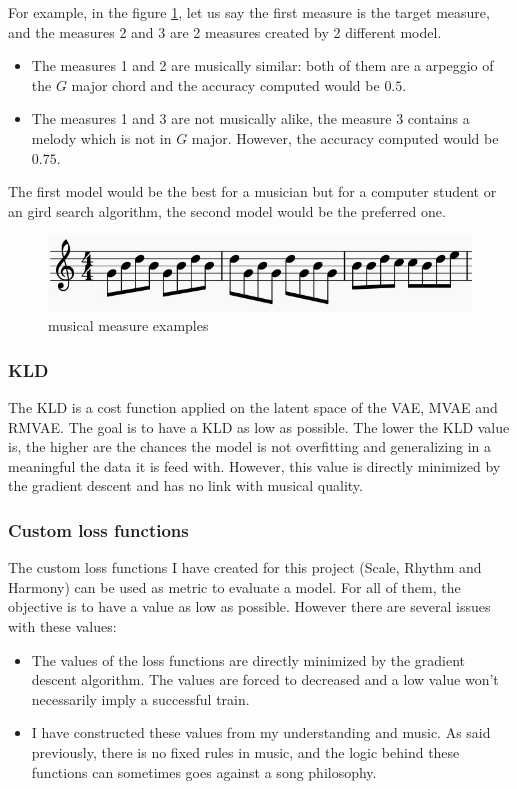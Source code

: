 \documentclass[12pt]{report}
\begin{document}
For example, in the figure \ref{fig:acc-difference}, let us say the first measure is the target measure, and the measures 2 and 3 are 2 measures created by 2 different model.
\begin{itemize}
    \item  The measures 1 and 2 are musically similar: both of them are a arpeggio of the $G$ major chord and the accuracy computed would be $0.5$.
    \item The measures 1 and 3 are not musically alike, the measure 3 contains a melody which is not in $G$ major.
    However, the accuracy computed would be $0.75$.
\end{itemize}
The first model would be the best for a musician but for a computer student or an gird search algorithm, the second model would be the preferred one.

\begin{figure}[htbp]
    \centering
    \includegraphics[width=\textwidth]{images/metrics/training/acc.jpg}
    \caption{musical measure examples}
    \label{fig:acc-difference}
\end{figure}

\subsubsection{KLD}

The KLD is a cost function applied on the latent space of the VAE, MVAE and RMVAE.
The goal is to have a KLD as low as possible.
The lower the KLD value is, the higher are the chances the model is not overfitting and generalizing in a meaningful the data it is feed with.
However, this value is directly minimized by the gradient descent and has no link with musical quality.

\subsubsection{Custom loss functions}
\label{sec:evaluate:train:custom-loss}

The custom loss functions I have created for this project (Scale, Rhythm and Harmony) can be used as metric to evaluate a model.
For all of them, the objective is to have a value as low as possible.
However there are several issues with these values:
\begin{itemize}
    \item The values of the loss functions are directly minimized by the gradient descent algorithm.
    The values are forced to decreased and a low value won't necessarily imply a successful train.
    \item I have constructed these values from my understanding and music.
    As said previously, there is no fixed rules in music, and the logic behind these functions can sometimes goes against a song philosophy.
\end{itemize}
\end{document}
